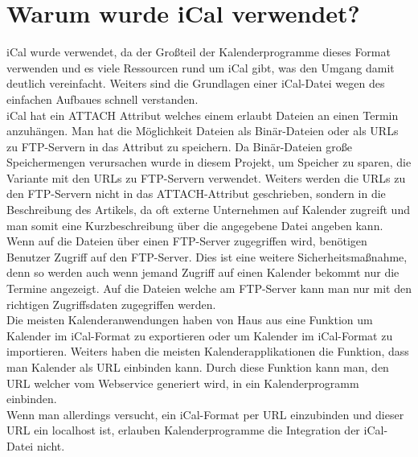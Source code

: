 \section{Warum wurde iCal verwendet?}
\label{sec:warumWurdeiCalVerwendet?}
iCal wurde verwendet, da der Großteil der Kalenderprogramme dieses Format verwenden und es viele Ressourcen rund um iCal gibt, was den Umgang damit deutlich vereinfacht. Weiters sind die Grundlagen einer iCal-Datei wegen des einfachen Aufbaues schnell verstanden.\\
iCal hat ein ATTACH Attribut welches einem erlaubt Dateien an einen Termin anzuhängen. Man hat die Möglichkeit Dateien als Binär-Dateien oder als URLs zu FTP-Servern in das Attribut zu speichern. Da Binär-Dateien große Speichermengen verursachen wurde in diesem Projekt, um Speicher zu sparen, die Variante mit den URLs zu FTP-Servern verwendet. Weiters werden die URLs zu den FTP-Servern nicht in das ATTACH-Attribut geschrieben, sondern in die Beschreibung des Artikels, da oft externe Unternehmen auf Kalender zugreift und man somit eine Kurzbeschreibung über die angegebene Datei angeben kann. Wenn auf die Dateien über einen FTP-Server zugegriffen wird, benötigen Benutzer Zugriff auf den FTP-Server. Dies ist eine weitere Sicherheitsmaßnahme, denn so werden auch wenn jemand Zugriff auf einen Kalender bekommt nur die Termine angezeigt. Auf die Dateien welche am FTP-Server kann man nur mit den richtigen Zugriffsdaten zugegriffen werden.\\
Die meisten Kalenderanwendungen haben von Haus aus eine Funktion um Kalender im iCal-Format zu exportieren oder um Kalender im iCal-Format zu importieren. Weiters haben die meisten Kalenderapplikationen die Funktion, dass man Kalender als URL einbinden kann. Durch diese Funktion kann man, den URL welcher vom Webservice generiert wird, in ein Kalenderprogramm einbinden.
\\
Wenn man allerdings versucht, ein iCal-Format per URL einzubinden und dieser URL ein localhost ist, erlauben Kalenderprogramme die Integration der iCal-Datei nicht.

